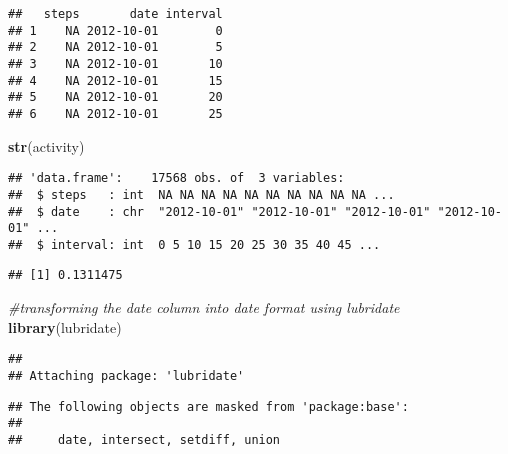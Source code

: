 \documentclass[
]{article}
\newenvironment{Shaded}{\begin{snugshade}}{\end{snugshade}}
\newcommand{\CommentTok}[1]{\textcolor[rgb]{0.56,0.35,0.01}{\textit{#1}}}
\newcommand{\DecValTok}[1]{\textcolor[rgb]{0.00,0.00,0.81}{#1}}
\newcommand{\KeywordTok}[1]{\textcolor[rgb]{0.13,0.29,0.53}{\textbf{#1}}}
\newcommand{\NormalTok}[1]{#1}
\newcommand{\OperatorTok}[1]{\textcolor[rgb]{0.81,0.36,0.00}{\textbf{#1}}}
\begin{document}
\begin{verbatim}
##   steps       date interval
## 1    NA 2012-10-01        0
## 2    NA 2012-10-01        5
## 3    NA 2012-10-01       10
## 4    NA 2012-10-01       15
## 5    NA 2012-10-01       20
## 6    NA 2012-10-01       25
\end{verbatim}

\begin{Shaded}
\begin{Highlighting}[]
\KeywordTok{str}\NormalTok{(activity)}
\end{Highlighting}
\end{Shaded}

\begin{verbatim}
## 'data.frame':    17568 obs. of  3 variables:
##  $ steps   : int  NA NA NA NA NA NA NA NA NA NA ...
##  $ date    : chr  "2012-10-01" "2012-10-01" "2012-10-01" "2012-10-01" ...
##  $ interval: int  0 5 10 15 20 25 30 35 40 45 ...
\end{verbatim}

\begin{Shaded}
\end{Shaded}

\begin{verbatim}
## [1] 0.1311475
\end{verbatim}

\begin{Shaded}
\begin{Highlighting}[]
\CommentTok{#transforming the date column into date format using lubridate}
\KeywordTok{library}\NormalTok{(lubridate)}
\end{Highlighting}
\end{Shaded}

\begin{verbatim}
## 
## Attaching package: 'lubridate'
\end{verbatim}

\begin{verbatim}
## The following objects are masked from 'package:base':
## 
##     date, intersect, setdiff, union
\end{verbatim}

\begin{Shaded}
\end{Shaded}
\end{document}

